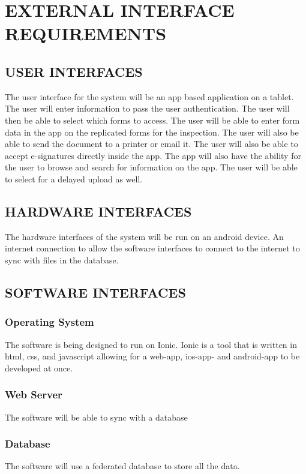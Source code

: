 \documentclass[twoside,letterpaper]{article}
\begin{document}
\clearpage\section[EXTERNAL INTERFACE
REQUIREMENTS]{\rmfamily\bfseries\color{black}
EXTERNAL INTERFACE
REQUIREMENTS}

\subsection[USER INTERFACES]{\rmfamily\bfseries\color{black}
USER INTERFACES}
{\rmfamily\color{black}
The user interface for the system will be an app based application on a tablet. The user will enter information to pass the user authentication. The user will then be able to select which forms to access. The user will be able to enter form data in the app on the replicated forms for the inspection. The user will also be able to send the document to a printer or email it. The user will also be able to accept e-signatures directly inside the app. The app will also have the ability for the user to browse and search for information on the app. The user will be able to select for a delayed upload as well.}

\subsection[HARDWARE INTERFACES]{\rmfamily\bfseries\color{black}
HARDWARE INTERFACES}
{\rmfamily\color{black}
  The hardware interfaces of the system will be run on an android device. An internet connection to allow the software interfaces to connect to the internet to sync with files in the database. }

\subsection[SOFTWARE INTERFACES]{\rmfamily\bfseries\color{black}
SOFTWARE INTERFACES}
{\rmfamily\color{black}
\subsubsection{Operating System} 
The software is being designed to run on Ionic. Ionic is a tool that is written in html, css, and javascript allowing for a web-app, ios-app- and android-app to be developed at once.
\subsubsection{Web Server}
The software will be able to sync with a database
\subsubsection{Database}
The software will use a federated database to store all the data.}
\end{document}
